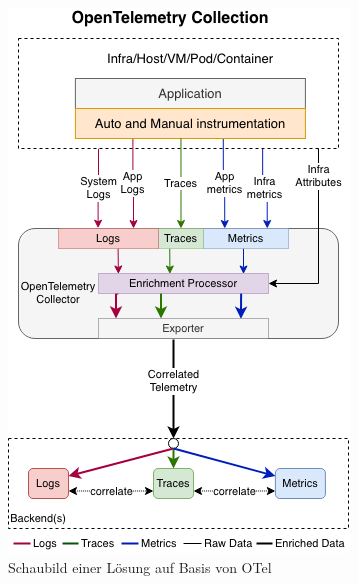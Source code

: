 \begin{figure}
\centering
\vspace{-2\baselineskip}
\includegraphics[width=\linewidth]{img/03_methoden/otel_unified-collection_2.png}
\caption{Schaubild einer Lösung auf Basis von OTel \cite{OpenTelemetryUnifiedCollection}}
\label{fig:otel-unified-collection}
\end{figure}

